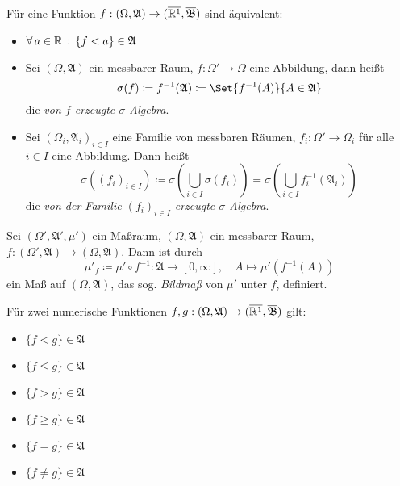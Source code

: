 \documentclass{cheat-sheet}
\newcommand{\Alg}{\mathfrak{A}} %
\newcommand{\Bor}{\mathfrak{B}} %
\renewcommand{\ER}{\overline{\R^1}} %
\begin{document}
\begin{satz}
  Für eine Funktion $f : (\Omega, \Alg) \to (\ER, \overline{\Bor})$ sind äquivalent:
  \begin{itemize}
    \miniitem{0.7 \linewidth}{$\forall \, a \in \R \,:\, \{ f \geq a \} = f^{-1}([a, \infty]) \in \Alg$}
    \item $\fa{a \in \R} \{ f < a \} \in \Alg$
  \end{itemize}
\end{satz}

\begin{defn}
  \begin{itemize}
    \item Sei $(\Omega, \Alg)$ ein messbarer Raum, $f : \Omega' \to \Omega$ eine Abbildung, dann heißt
    \[ \sigma(f) \coloneqq f^{-1}(\Alg) \coloneqq \Set{ f^{-1}(A) }{ A \in \Alg } \]
    die \emph{von $f$ erzeugte $\sigma$-Algebra}.
    \item Sei $(\Omega_i, \Alg_i)_{i \in I}$ eine Familie von messbaren Räumen, $f_i : \Omega' \to \Omega_i$ für alle $i \in I$ eine Abbildung. Dann heißt
    \[ \sigma((f_i)_{i \in I}) \coloneqq \sigma(\bigcup_{i \in I} \sigma(f_i)) = \sigma(\bigcup_{i \in I} f_i^{-1}(\Alg_i)) \]
    die \emph{von der Familie $(f_i)_{i \in I}$ erzeugte $\sigma$-Algebra}.
  \end{itemize}
\end{defn}

\begin{defn}
  Sei $(\Omega', \Alg', \mu')$ ein Maßraum, $(\Omega, \Alg)$ ein messbarer Raum, $f : (\Omega', \Alg) \to (\Omega, \Alg)$. Dann ist durch
  \[ \mu'_f \coloneqq \mu' \circ f^{-1} : \Alg \to [0, \infty], \quad A \mapsto \mu'(f^{-1}(A)) \]
  ein Maß auf $(\Omega, \Alg)$, das sog. \emph{Bildmaß} von $\mu'$ unter $f$, definiert.
\end{defn}

\begin{satz}
  Für zwei numerische Funktionen $f, g : (\Omega, \Alg) \to (\ER, \overline{\Bor})$ gilt:
  \begin{multicols}{3}
    \begin{itemize}
      \item $\{ f < g \} \in \Alg$
      \item $\{ f \leq g \} \in \Alg$
      \item $\{ f > g \} \in \Alg$
      \item $\{ f \geq g \} \in \Alg$
      \item $\{ f = g \} \in \Alg$
      \item $\{ f \not= g \} \in \Alg$
    \end{itemize}
  \end{multicols}
\end{satz}
\end{document}
